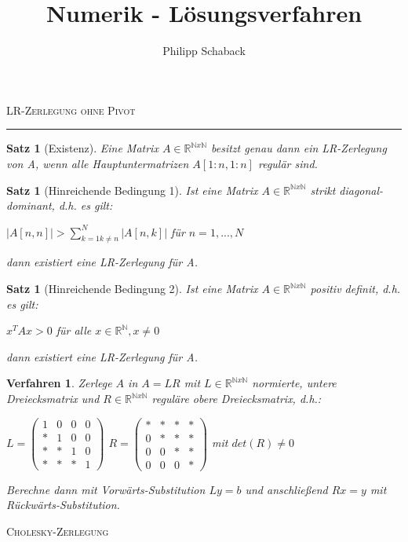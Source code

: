 \documentclass[a4paper]{article}
\author{Philipp Schaback}
\title{Numerik - Lösungsverfahren}
\newcounter{Sec}
\theoremstyle{marginbreak}
\newtheorem{satz}[definition]{Satz}
\newtheorem{verfahren}[definition]{Verfahren}
\newcommand{\sep}{%
	\rule{\textwidth}{0.3pt}%
	\stepcounter{Sec}%
}
\begin{document}
	\textsc{LR-Zerlegung ohne Pivot}
	\sep
	\begin{satz}[Existenz]
		Eine Matrix $A \in \mathbb{R}^{\mathbb{N}x\mathbb{N}} $ besitzt genau dann ein LR-Zerlegung von A, wenn alle Hauptuntermatrizen $A[1:n,1:n]$ regulär sind.
	\end{satz}
	\begin{satz}[Hinreichende Bedingung 1]
		Ist eine Matrix $A \in \mathbb{R}^{\mathbb{N}x\mathbb{N}} $ strikt diagonal-dominant, d.h. es gilt:
		\begin{description}
			\item $ |A[n,n]| > \sum_{k=1 k\ne n}^{N} |A[n,k]|$ für $n=1,...,N$
		\end{description}
		dann existiert eine LR-Zerlegung für A.
	\end{satz}
	\begin{satz}[Hinreichende Bedingung 2]
		Ist eine Matrix $A \in \mathbb{R}^{\mathbb{N}x\mathbb{N}} $ positiv definit, d.h. es gilt:
		\begin{description}
			\item $ x^TAx > 0 $ für alle $ x \in \mathbb{R}^\mathbb{N},x \ne 0$
		\end{description}
		dann existiert eine LR-Zerlegung für A.
	\end{satz}
	\begin{verfahren}
		Zerlege $A$ in $A=LR$ mit $ L \in \mathbb{R}^{\mathbb{N}x\mathbb{N}}$ normierte, untere Dreiecksmatrix und $ R \in \mathbb{R}^{\mathbb{N}x\mathbb{N}}$ reguläre obere Dreiecksmatrix, d.h.:
		\begin{description}
			\item $ L =
			\begin{pmatrix}
				1 & 0 & 0 & 0 \\
				* & 1 & 0 & 0 \\
				* & * & 1 & 0 \\
				* & * & * & 1
			\end{pmatrix}
			$\space
			$
			R = 
			\begin{pmatrix}
			* & * & * & * \\
			0 & * & * & * \\
			0 & 0 & * & * \\
			0 & 0 & 0 & *
			\end{pmatrix}
			$ mit $det(R) \ne 0$
		\end{description}
		Berechne dann mit Vorwärts-Substitution $ Ly = b$ und anschließend $ Rx = y$ mit Rückwärts-Substitution.
	\end{verfahren}
	\textsc{Cholesky-Zerlegung}
\end{document}
